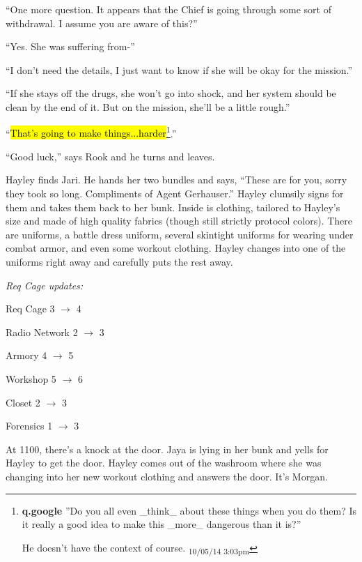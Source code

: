 ``One more question.  It appears that the Chief is going through some sort of withdrawal.  I assume you are aware of this?''

``Yes. She was suffering from-''

``I don't need the details, I just want to know if she will be okay for the mission.''

``If she stays off the drugs, she won't go into shock, and her system should be clean by the end of it.  But on the mission, she'll be a little rough.''

``\hl{That's going to make things...harder}\footnote{\textbf{q.google }''Do you all even \_think\_ about these things when you do them?  Is it really a good idea to make this \_more\_ dangerous than it is?''

He doesn't have the context of course. \textsubscript{10/05/14 3:03pm}}.''

``Good luck,'' says Rook and he turns and leaves.





Hayley finds Jari.  He hands her two bundles and says, ``These are for you, sorry they took so long.  Compliments of Agent Gerhauser.''  Hayley clumsily signs for them and takes them back to her bunk.  Inside is clothing, tailored to Hayley's size and made of high quality fabrics (though still strictly protocol colors).  There are uniforms, a battle dress uniform, several skintight uniforms for wearing under combat armor, and even some workout clothing.  Hayley changes into one of the uniforms right away and carefully puts the rest away.



\textit{Req Cage updates:}

Req Cage 3 $\rightarrow$ 4

Radio Network 2 $\rightarrow$  3

Armory 4 $\rightarrow$  5

Workshop 5 $\rightarrow$  6

Closet 2 $\rightarrow$  3

Forensics 1 $\rightarrow$  3





At 1100, there's a knock at the door.  Jaya is lying in her bunk and yells for Hayley to get the door.  Hayley comes out of the washroom where she was changing into her new workout clothing and answers the door.  It's Morgan.

